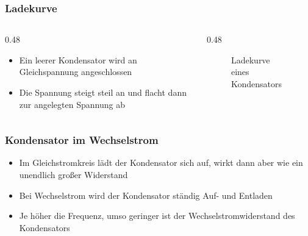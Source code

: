 \begin{frame}
\frametitle{Ladekurve}
\begin{columns}
    \begin{column}{0.48\textwidth}
    \begin{itemize}
  \item Ein leerer Kondensator wird an Gleichspannung angeschlossen
  \item Die Spannung steigt steil an und flacht dann zur angelegten Spannung ab 
  \end{itemize}

    \end{column}
   \begin{column}{0.48\textwidth}
       
\begin{figure}
    \caption{\scriptsize Ladekurve eines Kondensators}
    \label{e_ladekurve_kondensator}
\end{figure}


   \end{column}
\end{columns}

\end{frame}

\begin{frame}
\end{frame}

\begin{frame}
\frametitle{Kondensator im Wechselstrom}
\begin{itemize}
  \item Im Gleichstromkreis lädt der Kondensator sich auf, wirkt dann aber wie ein unendlich großer Widerstand
  \item Bei Wechselstrom wird der Kondensator ständig Auf- und Entladen
  \item Je höher die Frequenz, umso geringer ist der Wechselstromwiderstand des Kondensators
  \end{itemize}
\end{frame}

